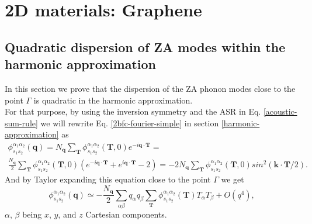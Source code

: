 
\chapter{2D materials: Graphene} %

\label{Chapter8} %




\section{Quadratic dispersion of ZA modes within the harmonic approximation}

In this section we prove that the dispersion of the ZA phonon modes close to the point $\Gamma$ is quadratic in the 
harmonic approximation. \\

For that purpose, by using the inversion symmetry and the ASR in Eq. \ref{acoustic-sum-rule} we will rewrite Eq. \ref{2bfc-fourier-simple} in section \ref{harmonic-approximation} as
\begin{multline}
 \phi_{s_{1}s_{2}}^{\alpha_{1}\alpha_{2}}(\mathbf{q})=N_{\mathbf{q}}\sum_{\mathbf{T}}\phi_{s_{1}s_{2}}^{\alpha_{1}\alpha_{2}}(\mathbf{T},0)e^{-i\mathbf{q}\cdot\mathbf{T}}=\\\frac{N_{\mathbf{q}}}{2}\sum_{\mathbf{T}}\phi_{s_{1}s_{2}}^{\alpha_{1}\alpha_{2}}(\mathbf{T},0)(e^{-i\mathbf{q}\cdot\mathbf{T}}+e^{i\mathbf{q}\cdot\mathbf{T}}-2)=-2N_{\mathbf{q}}\sum_{\mathbf{T}}\phi_{s_{1}s_{2}}^{\alpha_{1}\alpha_{2}}(\mathbf{T},0)sin^{2}(\mathbf{k}\cdot\mathbf{T}/2).
\end{multline}
And by Taylor expanding this equation close to the point $\Gamma$ we get
\begin{equation}
\label{need-zero}
\phi_{s_{1}s_{2}}^{\alpha_{1}\alpha_{2}}(\mathbf{q})\simeq -\frac{N_{\mathbf{q}}}{2}\sum_{\alpha\beta}q_{\alpha}q_{\beta}\sum_{\mathbf{T}}\phi_{s_{1}s_{2}}^{\alpha_{1}\alpha_{2}}(\mathbf{T})T_{\alpha}T_{\beta}+O(q^{4}),
\end{equation} 
$\alpha$, $\beta$ being $x$, $y$, and $z$ Cartesian components. \\

